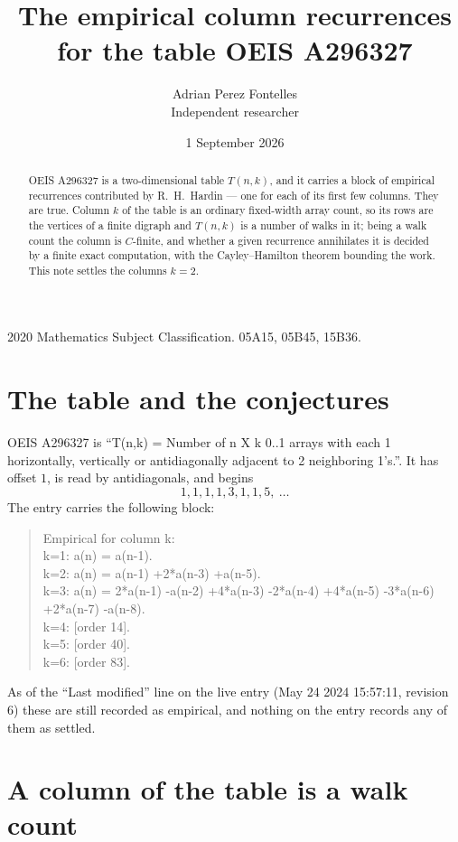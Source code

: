 \documentclass[11pt,a4paper]{article}
\title{The empirical column recurrences for the table OEIS A296327}
\author{Adrian Perez Fontelles\\ \small Independent researcher}
\date{1 September 2026}
\theoremstyle{plain}
\theoremstyle{definition}
\begin{document}
\maketitle

\begin{abstract}
OEIS A296327 is a two-dimensional table $T(n,k)$, and it carries a block of empirical
recurrences contributed by R.~H.~Hardin --- one for each of its first few columns. They are
true. Column $k$ of the table is an ordinary fixed-width array count, so its rows are the
vertices of a finite digraph and $T(n,k)$ is a number of walks in it; being a walk count the
column is $C$-finite, and whether a given recurrence annihilates it is decided by a finite
exact computation, with the Cayley--Hamilton theorem bounding the work. This note settles the columns $k=2$.
\end{abstract}

\noindent\small 2020 Mathematics Subject Classification. 05A15, 05B45, 15B36.\normalsize

\section{The table and the conjectures}

OEIS A296327 is ``T(n,k) = Number of n X k 0..1 arrays with each 1 horizontally, vertically or antidiagonally adjacent to 2 neighboring 1's.''. It has offset $1$, is
read by antidiagonals, and begins
\[
1, 1, 1, 1, 3, 1, 1, 5,\ \dots
\]
The entry carries the following block:
\begin{quote}\small
Empirical for column k:\\
k=1: a(n) = a(n-1).\\
k=2: a(n) = a(n-1) +2*a(n-3) +a(n-5).\\
k=3: a(n) = 2*a(n-1) -a(n-2) +4*a(n-3) -2*a(n-4) +4*a(n-5) -3*a(n-6) +2*a(n-7) -a(n-8).\\
k=4: [order 14].\\
k=5: [order 40].\\
k=6: [order 83].\\
\end{quote}
As of the ``Last modified'' line on the live entry (May 24 2024 15:57:11, revision 6) these are still
recorded as empirical, and nothing on the entry records any of them as settled.

\section{A column of the table is a walk count}
\end{document}
